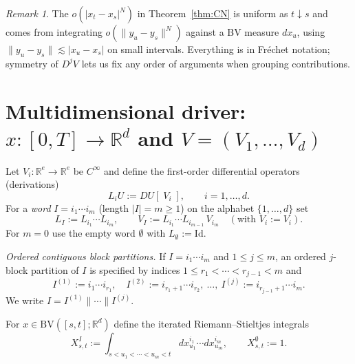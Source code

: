\documentclass[12pt]{article}
\theoremstyle{remark}
\newtheorem*{remark}{Remark}
\begin{document}
\begin{remark}
The $o(|x_t-x_s|^{N})$ in Theorem~\ref{thm:CN} is uniform as $t\downarrow s$
and comes from integrating $o(\|y_u-y_s\|^{N})$ against a BV measure $dx_u$,
using $\|y_u-y_s\|\lesssim |x_u-x_s|$ on small intervals.
Everything is in Fr\'echet notation; symmetry of $D^jV$ lets us fix any order of arguments when grouping contributions.
\end{remark}

\section*{Multidimensional driver: $x:[0,T]\to\mathbb{R}^d$ and $V=(V_1,\dots,V_d)$}

Let $V_i:\mathbb{R}^e\to\mathbb{R}^e$ be $C^\infty$ and define the first-order differential operators (derivations)
\[
L_i U := DU[\;V_i\;],\qquad i=1,\dots,d.
\]
For a \emph{word} $I=i_1\cdots i_m$ (length $|I|=m\ge1$) on the alphabet $\{1,\dots,d\}$ set
\[
L_I:=L_{i_1}\cdots L_{i_m},\qquad
V_I:=L_{i_1}\cdots L_{i_{m-1}}\,V_{i_m}\quad(\text{with }V_{i}:=V_i).
\]
For $m=0$ use the empty word $\emptyset$ with $L_{\emptyset}:=\mathrm{Id}$.

\noindent\textit{Ordered contiguous block partitions.}
If $I=i_1\cdots i_m$ and $1\le j\le m$, an ordered $j$-block partition of $I$
is specified by indices $1\le r_1<\cdots<r_{j-1}<m$ and
\[
I^{(1)}:=i_1\cdots i_{r_1},\quad
I^{(2)}:=i_{r_1+1}\cdots i_{r_2},\ \dots,\ 
I^{(j)}:=i_{r_{j-1}+1}\cdots i_m.
\]
We write $I=I^{(1)}\|\cdots\| I^{(j)}$.

For $x\in \mathrm{BV}([s,t];\mathbb{R}^d)$ define the iterated Riemann–Stieltjes integrals
\[
X^I_{s,t}
:=\!\!\int_{s<u_1<\cdots<u_m<t}\!\!dx^{i_1}_{u_1}\cdots dx^{i_m}_{u_m},\qquad X^{\emptyset}_{s,t}:=1.
\]
\end{document}
